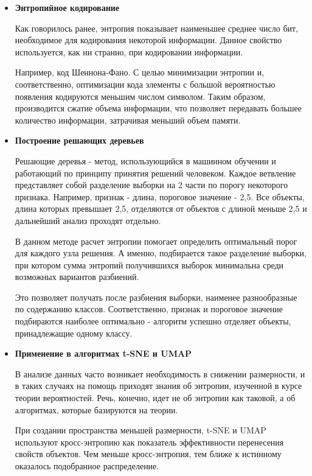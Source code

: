 \begin{itemize}
	\item \textbf{Энтропийное кодирование}~\
	
	Как говорилось ранее, энтропия показывает наименьшее среднее число бит, необходимое для кодирования некоторой информации. Данное свойство используется, как ни странно, при кодировании информации.
	
	Например, код Шеннона-Фано. С целью минимизации энтропии и, соответственно, оптимизации кода элементы с большой вероятностью появления кодируются меньшим числом символом. Таким образом, производится сжатие объема информации, что позволяет передавать большее количество информации, затрачивая меньший объем памяти.
	
	\item \textbf{Построение решающих деревьев}
	
	Решающие деревья - метод, использующийся в машинном обучении и работающий по принципу принятия решений человеком. Каждое ветвление представляет собой разделение выборки на 2 части по порогу некоторого признака. Например, признак - длина, пороговое значение -  2,5. Все объекты, длина которых превышает 2,5, отделяются от объектов с длиной меньше 2,5 и дальнейший анализ проходят отдельно.
	
	В данном методе расчет энтропии помогает определить оптимальный порог для каждого узла решения. А именно, подбирается такое разделение выборки, при котором сумма энтропий получившихся выборок минимальна среди возможных вариантов разбиений.
	
	Это позволяет получать после разбиения выборки, наименее разнообразные по содержанию классов. Соответственно, признак и пороговое значение подбираются наиболее оптимально - алгоритм успешно отделяет объекты, принадлежащие одному классу.
	
	\item \textbf{Применение в алгоритмах t-SNE и UMAP}
	
	В анализе данных часто возникает необходимость в снижении размерности, и в таких случаях на помощь приходят знания об энтропии, изученной в курсе теории вероятностей. Речь, конечно, идет не об энтропии как таковой, а об алгоритмах, которые базируются на теории.
	
	При создании пространства меньшей размерности, t-SNE и UMAP используют кросс-энтропию как показатель эффективности перенесения свойств объектов. Чем меньше кросс-энтропия, тем ближе к истинному оказалось подобранное распределение.
	

\end{itemize}
